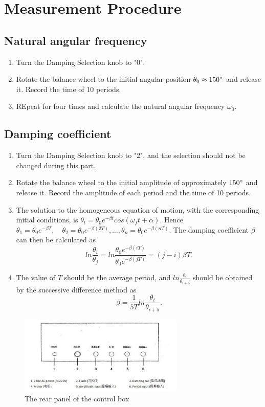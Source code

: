 \section{Measurement Procedure}
\subsection{Natural angular frequency}
    \begin{enumerate}
        \item Turn the Damping Selection knob to "0".
        \item Rotate the balance wheel to the initial angular position $\theta_0 \approx 150^\circ$ and release it. Record the time of 10 periods.
        \item REpeat for four times and calculate the natural angular frequency $\omega_0$.
    \end{enumerate}

\subsection{Damping coefficient}
    \begin{enumerate}    
        \item Turn the Damping Selection knob to "2", and the selection should not be changed during this part.
        \item Rotate the balance wheel to the initial amplitude of approximately $150^\circ$ and release it. Record the amplitude of each period and the time of 10 periods.
        \item The solution to the homogeneous equation of motion, with the corresponding initial conditions, is $\theta_{t}=\theta_0e^{-\beta t}cos(\omega_ft+\alpha)$. Hence $\theta_1=\theta_0e^{-\beta T}, \quad \theta_2=\theta_0e^{-\beta (2T)}, \hdots, \theta_n=\theta_0e^{-\beta (nT)}$. The damping coefficient $\beta$ can then be calculated as
        \[
            ln\frac{\theta_i}{\theta_j}=ln\frac{\theta_0e^{-\beta (iT)}}{\theta_0e^{-\beta (jT)}}=(j-i)\beta T.
        \]
        \item The value of $T$ should be the average period, and $ln\frac{\theta_i}{\theta_{i+5}}$ should be obtained by the successive difference method as
        \[
            \beta=\frac{1}{5T}ln\frac{\theta_i}{\theta_{i+5}}.
        \]
    \end{enumerate}

    \begin{figure}[H]
    \centering
        \includegraphics[width=0.7\textwidth]{images/4}
        \caption{The rear panel of the control box}\label{real}
    \end{figure}

